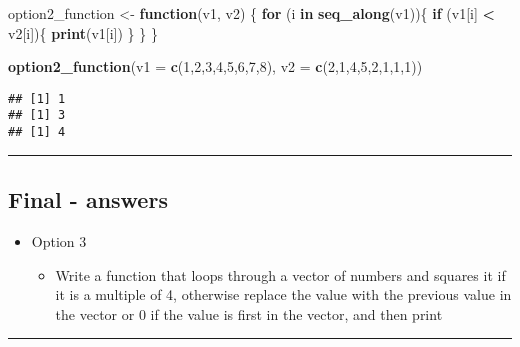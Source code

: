 \documentclass[]{article}
\newenvironment{Shaded}{\begin{snugshade}}{\end{snugshade}}
\newcommand{\ControlFlowTok}[1]{\textcolor[rgb]{0.13,0.29,0.53}{\textbf{#1}}}
\newcommand{\DataTypeTok}[1]{\textcolor[rgb]{0.13,0.29,0.53}{#1}}
\newcommand{\DecValTok}[1]{\textcolor[rgb]{0.00,0.00,0.81}{#1}}
\newcommand{\KeywordTok}[1]{\textcolor[rgb]{0.13,0.29,0.53}{\textbf{#1}}}
\newcommand{\NormalTok}[1]{#1}
\newcommand{\OperatorTok}[1]{\textcolor[rgb]{0.81,0.36,0.00}{\textbf{#1}}}
\newcommand{\StringTok}[1]{\textcolor[rgb]{0.31,0.60,0.02}{#1}}
\providecommand{\tightlist}{%
  \setlength{\itemsep}{0pt}\setlength{\parskip}{0pt}}
\begin{document}
\begin{Shaded}
\begin{Highlighting}[]
\NormalTok{option2_function <-}\StringTok{ }\ControlFlowTok{function}\NormalTok{(v1, v2) \{}
  \ControlFlowTok{for}\NormalTok{ (i }\ControlFlowTok{in} \KeywordTok{seq_along}\NormalTok{(v1))\{}
    \ControlFlowTok{if}\NormalTok{ (v1[i] }\OperatorTok{<}\StringTok{ }\NormalTok{v2[i])\{}
      \KeywordTok{print}\NormalTok{(v1[i])}
\NormalTok{      \}}
\NormalTok{  \}}
\NormalTok{\}}

\KeywordTok{option2_function}\NormalTok{(}\DataTypeTok{v1 =} \KeywordTok{c}\NormalTok{(}\DecValTok{1}\NormalTok{,}\DecValTok{2}\NormalTok{,}\DecValTok{3}\NormalTok{,}\DecValTok{4}\NormalTok{,}\DecValTok{5}\NormalTok{,}\DecValTok{6}\NormalTok{,}\DecValTok{7}\NormalTok{,}\DecValTok{8}\NormalTok{), }\DataTypeTok{v2 =} \KeywordTok{c}\NormalTok{(}\DecValTok{2}\NormalTok{,}\DecValTok{1}\NormalTok{,}\DecValTok{4}\NormalTok{,}\DecValTok{5}\NormalTok{,}\DecValTok{2}\NormalTok{,}\DecValTok{1}\NormalTok{,}\DecValTok{1}\NormalTok{,}\DecValTok{1}\NormalTok{))}
\end{Highlighting}
\end{Shaded}

\begin{verbatim}
## [1] 1
## [1] 3
## [1] 4
\end{verbatim}

\begin{center}\rule{0.5\linewidth}{\linethickness}\end{center}

\hypertarget{final---answers-2}{%
\subsection{Final - answers}\label{final---answers-2}}

\begin{itemize}
\tightlist
\item
  Option 3

  \begin{itemize}
  \tightlist
  \item
    Write a function that loops through a vector of numbers and squares
    it if it is a multiple of 4, otherwise replace the value with the
    previous value in the vector or 0 if the value is first in the
    vector, and then print
  \end{itemize}
\end{itemize}

\begin{center}\rule{0.5\linewidth}{\linethickness}\end{center}
\end{document}
